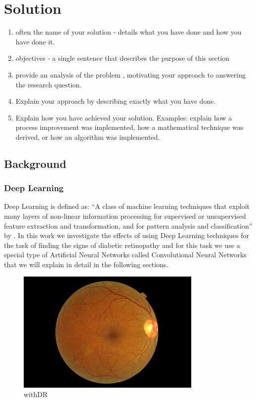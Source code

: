 \chapter{Solution}
\begin{enumerate}
    \item often the name of your solution - details what you have done and how you have done it.
    \item objectives - a single sentence that describes the purpose of this section
    \item provide an analysis of the problem , motivating your approach to answering the research question.
    \item Explain your approach by describing exactly what you have done.
    \item Explain how you have achieved your solution. Examples: explain how a process improvement was implemented, how a mathematical technique was derived, or how an algorithm was implemented.
\end{enumerate}

\section{Background}
\subsection{Deep Learning}
Deep Learning is defined as:
``A class of machine learning techniques that exploit many layers of non-linear information processing for supervised or unsupervised feature extraction and transformation, and for pattern analysis and classification''
by \citet[][\emph{Deep Learning Methods and Applications}]{deng2014deep}. In this work we investigate the effects of using Deep Learning techniques for the task of finding the signs of diabetic retinopathy and for this task we use a special type of Artificial Neural Networks called Convolutional Neural Networks that we will explain in detail in the following sections.   

\begin{figure}[t]
\centering
\includegraphics[width=0.8\textwidth]{Figures/DR}
\caption{withDR}
\label{figDR}
\end{figure}

